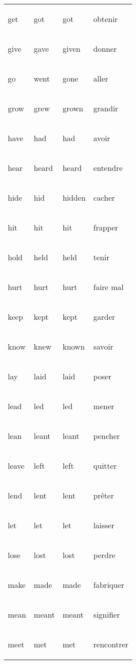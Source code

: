 \documentclass[
]{article}
\begin{document}
\begin{longtable}{>{\bfseries\raggedright\arraybackslash}p{3cm}ll>{\bfseries\raggedright\arraybackslash}p{3cm}}
\rowcolor{gray!6}  get & got & got & obtenir\\

give & gave & given & donner\\

\rowcolor{gray!6}  go & went & gone & aller\\

grow & grew & grown & grandir\\

\rowcolor{gray!6}  have & had & had & avoir\\

hear & heard & heard & entendre\\

\rowcolor{gray!6}  hide & hid & hidden & cacher\\

hit & hit & hit & frapper\\

\rowcolor{gray!6}  hold & held & held & tenir\\

hurt & hurt & hurt & faire mal\\

\rowcolor{gray!6}  keep & kept & kept & garder\\

know & knew & known & savoir\\

\rowcolor{gray!6}  lay & laid & laid & poser\\

lead & led & led & mener\\

\rowcolor{gray!6}  lean & leant & leant & pencher\\

leave & left & left & quitter\\

\rowcolor{gray!6}  lend & lent & lent & prêter\\

let & let & let & laisser\\

\rowcolor{gray!6}  lose & lost & lost & perdre\\

make & made & made & fabriquer\\

\rowcolor{gray!6}  mean & meant & meant & signifier\\

meet & met & met & rencontrer\\


\end{longtable}
\end{document}

